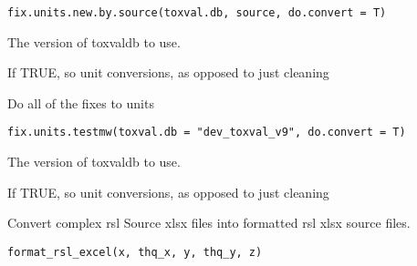 \documentclass[letterpaper]{book}
\begin{document}
%
\begin{Usage}
\begin{verbatim}
fix.units.new.by.source(toxval.db, source, do.convert = T)
\end{verbatim}
\end{Usage}
%
\begin{Arguments}
\begin{ldescription}
\item[\code{toxval.db}] The version of toxvaldb to use.

\item[\code{do.convert}] If TRUE, so unit conversions, as opposed to just cleaning
\end{ldescription}
\end{Arguments}
%
\begin{Description}\relax
Do all of the fixes to units
\end{Description}
%
\begin{Usage}
\begin{verbatim}
fix.units.testmw(toxval.db = "dev_toxval_v9", do.convert = T)
\end{verbatim}
\end{Usage}
%
\begin{Arguments}
\begin{ldescription}
\item[\code{toxval.db}] The version of toxvaldb to use.

\item[\code{do.convert}] If TRUE, so unit conversions, as opposed to just cleaning
\end{ldescription}
\end{Arguments}
%
\begin{Description}\relax
Convert complex rsl Source xlsx files into formatted rsl xlsx source files.
\end{Description}
%
\begin{Usage}
\begin{verbatim}
format_rsl_excel(x, thq_x, y, thq_y, z)
\end{verbatim}
\end{Usage}
%
\end{document}
